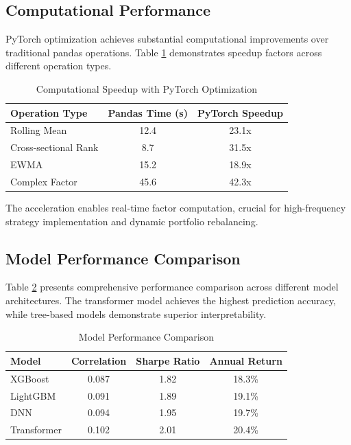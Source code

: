 \documentclass[conference]{IEEEtran}
\begin{document}
\subsection{Computational Performance}

PyTorch optimization achieves substantial computational improvements over traditional pandas operations. Table \ref{tab:computation_speedup} demonstrates speedup factors across different operation types.

\begin{table}[htbp]
\centering
\caption{Computational Speedup with PyTorch Optimization}
\label{tab:computation_speedup}
\begin{tabular}{lcc}
\toprule
Operation Type & Pandas Time (s) & PyTorch Speedup \\
\midrule
Rolling Mean & 12.4 & 23.1x \\
Cross-sectional Rank & 8.7 & 31.5x \\
EWMA & 15.2 & 18.9x \\
Complex Factor & 45.6 & 42.3x \\
\bottomrule
\end{tabular}
\end{table}

The acceleration enables real-time factor computation, crucial for high-frequency strategy implementation and dynamic portfolio rebalancing.

\subsection{Model Performance Comparison}

Table \ref{tab:model_comparison} presents comprehensive performance comparison across different model architectures. The transformer model achieves the highest prediction accuracy, while tree-based models demonstrate superior interpretability.

\begin{table}[htbp]
\centering
\caption{Model Performance Comparison}
\label{tab:model_comparison}
\begin{tabular}{lccc}
\toprule
Model & Correlation & Sharpe Ratio & Annual Return \\
\midrule
XGBoost & 0.087 & 1.82 & 18.3\% \\
LightGBM & 0.091 & 1.89 & 19.1\% \\
DNN & 0.094 & 1.95 & 19.7\% \\
Transformer & 0.102 & 2.01 & 20.4\% \\
\bottomrule
\end{tabular}
\end{table}
\end{document}
